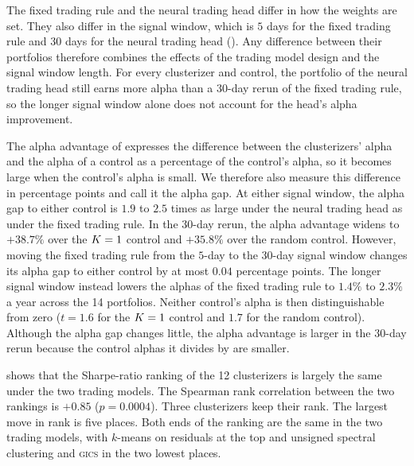 The fixed trading rule and the neural trading head differ in how the weights are set. They also differ in the signal window, which is $5$ days for the fixed trading rule and $30$ days for the neural trading head (). Any difference between their portfolios therefore combines the effects of the trading model design and the signal window length. For every clusterizer and control, the portfolio of the neural trading head still earns more alpha than a $30$-day rerun of the fixed trading rule, so the longer signal window alone does not account for the head's alpha improvement.

The alpha advantage of  expresses the difference between the clusterizers' alpha and the alpha of a control as a percentage of the control's alpha, so it becomes large when the control's alpha is small. We therefore also measure this difference in percentage points and call it the alpha gap. At either signal window, the alpha gap to either control is $1.9$ to $2.5$ times as large under the neural trading head as under the fixed trading rule. In the $30$-day rerun, the alpha advantage widens to $+38.7\%$ over the $K=1$ control and $+35.8\%$ over the random control. However, moving the fixed trading rule from the $5$-day to the $30$-day signal window changes its alpha gap to either control by at most $0.04$ percentage points. The longer signal window instead lowers the alphas of the fixed trading rule to $1.4\%$ to $2.3\%$ a year across the 14 portfolios. Neither control's alpha is then distinguishable from zero ($t = 1.6$ for the $K=1$ control and $1.7$ for the random control). Although the alpha gap changes little, the alpha advantage is larger in the $30$-day rerun because the control alphas it divides by are smaller.

 shows that the Sharpe-ratio ranking of the 12 clusterizers is largely the same under the two trading models. The Spearman rank correlation between the two rankings is $+0.85$ ($p = 0.0004$). Three clusterizers keep their rank. The largest move in rank is five places. Both ends of the ranking are the same in the two trading models, with $k$-means on residuals at the top and unsigned spectral clustering and \textsc{gics} in the two lowest places.


